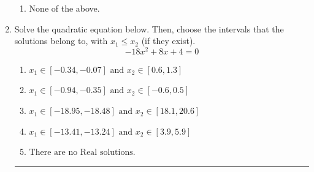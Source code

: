 \documentclass[14pt]{extbook}
\newcommand{\litem}[1]{\item#1\hspace*{-1cm}\rule{\textwidth}{0.4pt}}
\begin{document}
\begin{enumerate}
{\begin{enumerate}[label=\Alph*.]
\item None of the above.
\end{enumerate} }
\litem{
Solve the quadratic equation below. Then, choose the intervals that the solutions belong to, with $x_1 \leq x_2$ (if they exist).\[ -18x^{2} +8 x + 4 = 0 \]\begin{enumerate}[label=\Alph*.]
\item \( x_1 \in [-0.34, -0.07] \text{ and } x_2 \in [0.6, 1.3] \)
\item \( x_1 \in [-0.94, -0.35] \text{ and } x_2 \in [-0.6, 0.5] \)
\item \( x_1 \in [-18.95, -18.48] \text{ and } x_2 \in [18.1, 20.6] \)
\item \( x_1 \in [-13.41, -13.24] \text{ and } x_2 \in [3.9, 5.9] \)
\item \( \text{There are no Real solutions.} \)


\end{enumerate}}
\end{enumerate}
\end{document}

